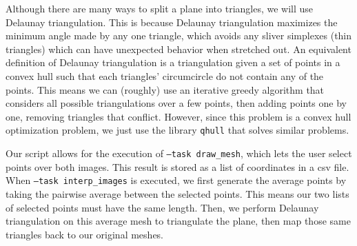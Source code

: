 \documentclass[a4paper]{article}
\begin{document}
Although there are many ways to split a plane into triangles, we will use Delaunay triangulation. This is because Delaunay triangulation maximizes the minimum angle made by any one triangle, which avoids any sliver simplexes (thin triangles) which can have unexpected behavior when stretched out. An equivalent definition of Delaunay triangulation is a triangulation given a set of points in a convex hull such that each triangles' circumcircle do not contain any of the points. This means we can (roughly) use an iterative greedy algorithm that considers all possible triangulations over a few points, then adding points one by one, removing triangles that conflict. However, since this problem is a convex hull optimization problem, we just use the library \texttt{qhull} that solves similar problems.

Our script allows for the execution of \texttt{---task draw\_mesh}, which lets the user select points over both images. This result is stored as a list of coordinates in a csv file. When \texttt{---task interp\_images} is executed, we first generate the average points by taking the pairwise average between the selected points. This means our two lists of selected points must have the same length. Then, we perform Delaunay triangulation on this average mesh to triangulate the plane, then map those same triangles back to our original meshes.
\end{document}
